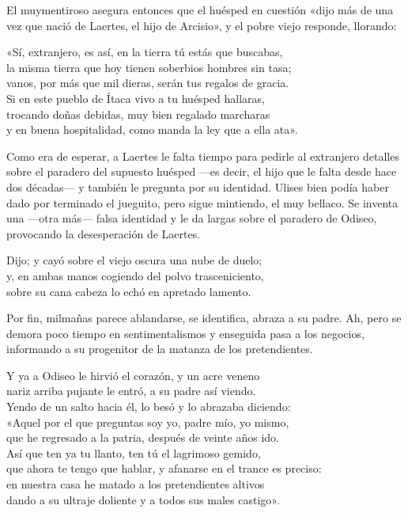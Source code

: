 El muymentiroso asegura entonces que el huésped en cuestión «dijo más de una vez que nació de Laertes, el hijo de Arcisio», y el pobre viejo responde, llorando:

\begin{versocita}
«Sí, extranjero, es así, en la tierra tú estás que buscabas,\\
la misma tierra que hoy tienen soberbios hombres sin tasa;\\
vanos, por más que mil dieras, serán tus regalos de gracia.\\
Si en este pueblo de Ítaca vivo a tu huésped hallaras,\\
trocando doñas debidas, muy bien regalado marcharas\\
y en buena hospitalidad, como manda la ley que a ella ata».
\end{versocita}

Como era de esperar, a Laertes le falta tiempo para pedirle al extranjero detalles sobre el paradero del supuesto huésped ---es decir, el hijo que le falta desde hace dos décadas--- y también le pregunta por su identidad. Ulises bien podía haber dado por terminado el jueguito, pero sigue mintiendo, el muy bellaco. Se inventa una ---otra más--- falsa identidad y le da largas sobre el paradero de Odiseo, provocando la desesperación de Laertes.

\begin{versocita}
Dijo; y cayó sobre el viejo oscura una nube de duelo;\\
y, en ambas manos cogiendo del polvo trasceniciento,\\
sobre su cana cabeza lo echó en apretado lamento.
\end{versocita}

Por fin, milmañas parece ablandarse, se identifica, abraza a su padre. Ah, pero se demora poco tiempo en sentimentalismos y enseguida pasa a los negocios, informando a su progenitor de la matanza de los pretendientes.

\begin{versocita}
Y ya a Odiseo le hirvió el corazón, y un acre veneno\\
nariz arriba pujante le entró, a su padre así viendo.\\
Yendo de un salto hacia él, lo besó y lo abrazaba diciendo:\\
«Aquel por el que preguntas soy yo, padre mío, yo mismo,\\
que he regresado a la patria, después de veinte años ido.\\
Así que ten ya tu llanto, ten tú el lagrimoso gemido,\\
que ahora te tengo que hablar, y afanarse en el trance es preciso:\\
en nuestra casa he matado a los pretendientes altivos\\
dando a su ultraje doliente y a todos sus males castigo».
\end{versocita}

